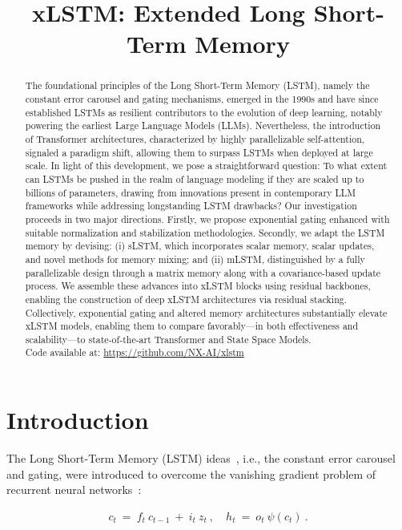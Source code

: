 \title{xLSTM: Extended Long Short-Term Memory}

\begin{abstract}
The foundational principles of the Long Short-Term Memory (LSTM), namely the constant error carousel and gating mechanisms, emerged in the 1990s and have since established LSTMs as resilient contributors to the evolution of deep learning, notably powering the earliest Large Language Models (LLMs). Nevertheless, the introduction of Transformer architectures, characterized by highly parallelizable self-attention, signaled a paradigm shift, allowing them to surpass LSTMs when deployed at large scale. In light of this development, we pose a straightforward question: To what extent can LSTMs be pushed in the realm of language modeling if they are scaled up to billions of parameters, drawing from innovations present in contemporary LLM frameworks while addressing longstanding LSTM drawbacks? Our investigation proceeds in two major directions. Firstly, we propose exponential gating enhanced with suitable normalization and stabilization methodologies. Secondly, we adapt the LSTM memory by devising: (i) sLSTM, which incorporates scalar memory, scalar updates, and novel methods for memory mixing; and (ii) mLSTM, distinguished by a fully parallelizable design through a matrix memory along with a covariance-based update process. We assemble these advances into xLSTM blocks using residual backbones, enabling the construction of deep xLSTM architectures via residual stacking. Collectively, exponential gating and altered memory architectures substantially elevate xLSTM models, enabling them to compare favorably—in both effectiveness and scalability—to state-of-the-art Transformer and State Space Models.\\
Code available at: \url{https://github.com/NX-AI/xlstm}
\end{abstract}

\section{Introduction}
\label{sec:intro}

The Long Short-Term Memory (LSTM) ideas~\citep{Hochreiter:91,Hochreiter:97nips,Hochreiter:97}, i.e., the constant error carousel and gating, were introduced to overcome the vanishing gradient problem of recurrent neural networks~\citep{Hochreiter:91,Hochreiter:00book}:

\begin{align}
\label{eq:lstm_idea}
  c_t \ = \ f_t \ c_{t-1} \ + \ 
          i_t \  z_t \ , \quad  
          h_t \ = \ o_t \ \psi({c_t}) \ . 
\end{align}

